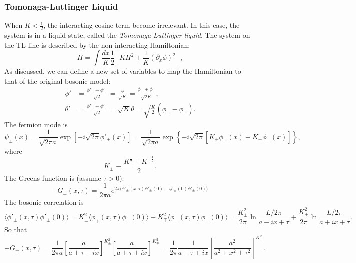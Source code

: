 \documentclass[aps,prb,superscriptaddress,nofootinbib]{revtex4}
\begin{document}
\subsubsection{Tomonaga-Luttinger Liquid}
When $K<\frac{1}{2}$, the interacting cosine term become irrelevant.
In this case, the system is in a liquid state, called the \textit{Tomonaga-Luttinger liquid}.
The system on the TL line is described by the non-interacting Hamiltonian:
\begin{equation}
	H = \int \frac{dx}{K} \frac{1}{2}\left[K \Pi^2 + \frac{1}{K}(\partial_x\phi)^2 \right],
\end{equation}
As discussed, we can define a new set of variables to map the Hamiltonian to that of the original bosonic model:
\begin{equation}
\begin{aligned}
	\phi' &= \frac{\phi'_-+\phi'_+}{\sqrt 2} = \frac{\phi}{\sqrt{K}} = \frac{\phi_-+\phi_+}{\sqrt{2K}}, \\
	\theta' &= \frac{\phi'_--\phi'_+}{\sqrt 2} = \sqrt{K} \theta = \sqrt{\frac{K}{2}}(\phi_--\phi_+).
\end{aligned}
\end{equation}
The fermion mode is
\begin{equation}
	\psi_{\pm}(x) = \frac{1}{\sqrt{2\pi a}} \exp\left[-i\sqrt{2\pi} \phi'_{\pm}(x) \right]
	= \frac{1}{\sqrt{2\pi a}} \exp\left\{-i\sqrt{2\pi} \left[K_\pm \phi_+(x)+ K_\mp \phi_-(x) \right]\right\},
\end{equation}
where 
\begin{equation}
	K_\pm \equiv \frac{K^{\frac{1}{2}} \pm K^{-\frac{1}{2}}}{2}.
\end{equation}
The Greens function is (assume $\tau>0$):
\begin{equation}
	-G_{\pm}(x,\tau) 
	= \frac{1}{2\pi a} e^{2\pi \langle \phi'_\pm(x,\tau)\phi'_\pm(0) - \phi'_\pm(0)\phi'_\pm(0) \rangle}
\end{equation}
The bosonic correlation is
\begin{equation}
	\langle \phi'_\pm(x,\tau)\phi'_\pm(0) \rangle
	= K_\pm^2 \langle \phi_+(x,\tau)\phi_+(0)\rangle + K_\mp^2 \langle\phi_-(x,\tau)\phi_-(0)\rangle 
	= \frac{K_\pm^2}{2\pi}\ln \frac{L/2\pi}{a-ix+\tau} + \frac{K_\mp^2}{2\pi}\ln \frac{L/2\pi}{a+ix +\tau}.
\end{equation}
So that
\begin{equation}
	-G_{\pm}(x,\tau) 
	= \frac{1}{2\pi a} \left[\frac{a}{a + \tau - ix}\right]^{K_\pm^2} \left[\frac{a}{a + \tau + i x}\right]^{K_\mp^2} 
	= \frac{1}{2\pi} \frac{1}{a + \tau \mp ix} \left[\frac{a^2}{a^2+x^2+\tau^2}\right]^{K_-^2}.
\end{equation}
\end{document}

